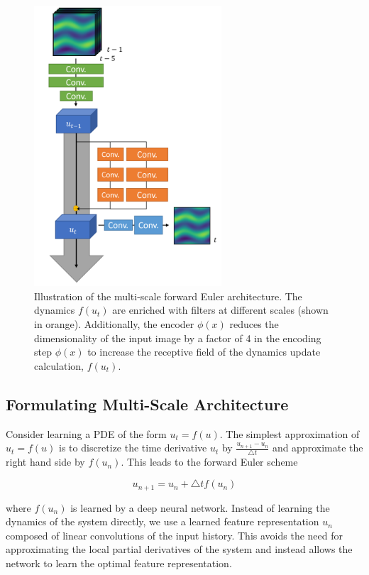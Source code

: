 \documentclass[12pt]{article}
\theoremstyle{plain}
\theoremstyle{remark}
\theoremstyle{definition}
\begin{document}
\begin{figure}
\begin{minipage}[c]{0.49\textwidth}
	\end{minipage}
	\begin{minipage}[c]{0.49\textwidth}
		\centering
		\includegraphics[width=2.75in]{pde_arch_multi}
		\caption{Illustration of the multi-scale forward Euler architecture. The
		dynamics $f(u_t)$ are enriched with filters at different scales (shown in orange). Additionally, the encoder $\phi(x)$ reduces the dimensionality of the input image by a factor of 4 in the encoding step $\phi(x)$ to increase the receptive field of the dynamics update calculation, $f(u_t)$. }
		\label{fig:arch_multi}
	\end{minipage}
\end{figure}



\subsection{Formulating Multi-Scale Architecture}

Consider learning a PDE of the form $u_t = f(u)$. The simplest approximation of $u_t = f(u)$ is to discretize the time derivative $u_t$ by $\frac{u_{n+1} - u_n}{\bigtriangleup t}$ and approximate the right hand side by $f(u_n)$. This leads to the forward Euler scheme  

$$u_{n+1} = u_n + \bigtriangleup t f(u_n) \label{eqn:ode} $$

where $f(u_n)$ is learned by a deep neural network. Instead of learning the dynamics of the system directly, we use a learned feature representation $u_n$ composed of linear convolutions of the input history. This avoids the need for approximating the local partial derivatives of the system and instead allows the network to learn the optimal feature representation.
\end{document}
